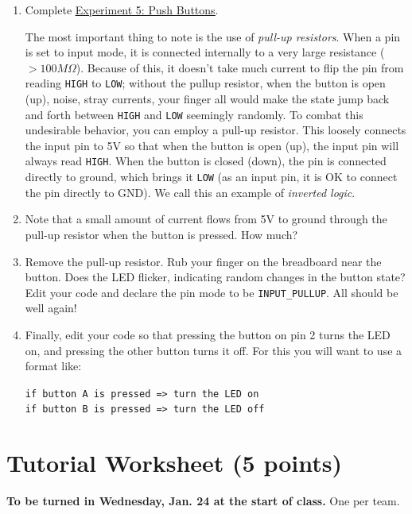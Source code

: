 \documentclass[11pt]{article} %
\begin{document}
\begin{enumerate}
\item Complete \href{https://learn.sparkfun.com/tutorials/sik-experiment-guide-for-arduino---v32/experiment-5-push-buttons}{\underline{Experiment 5: Push Buttons}}.

The most important thing to note is the use of \emph{pull-up resistors}. When a pin is set to input mode, it is connected internally to a very large resistance ($>100M\Omega$). Because of this, it doesn't take much current to flip the pin from reading \verb|HIGH| to \verb|LOW|; without the pullup resistor, when the button is open (up), noise, stray currents, your finger all would make the state jump back and forth between \verb|HIGH| and \verb|LOW| seemingly randomly. To combat this undesirable behavior, you can employ a pull-up resistor. This loosely connects the input pin to 5V so that when the button is open (up), the input pin will always read \verb|HIGH|. When the button is closed (down), the pin is connected directly to ground, which brings it \verb|LOW| (as an input pin, it is OK to connect the pin directly to GND). We call this an example of \emph{inverted logic}.

\item Note that a small amount of current flows from 5V to ground through the pull-up resistor when the button is pressed. How much?
\item Remove the pull-up resistor. Rub your finger on the breadboard near the button. Does the LED flicker, indicating random changes in the button state? Edit your code and declare the pin mode to be \verb|INPUT_PULLUP|. All should be well again!
\item Finally, edit your code so that pressing the button on pin 2 turns the LED on, and pressing the other button turns it off. For this you will want to use a format like: 

\verb|if button A is pressed => turn the LED on|\\
\verb|if button B is pressed => turn the LED off|

\end{enumerate}

\clearpage
\section*{Tutorial Worksheet (5 points)}
\label{sec:prelab}

{\bf To be turned in Wednesday, Jan. 24 at the start of class.} One per team.
\end{document}
